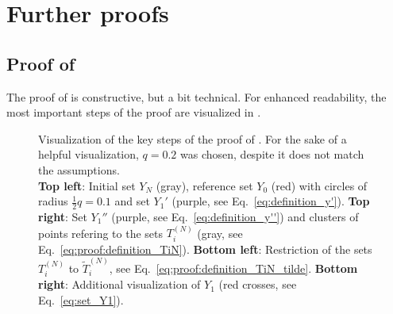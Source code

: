 \documentclass[a4paper, 10pt]{article}
\newlength\fwidth
\begin{document}
\section{Further proofs} \label{sec:proofs}

\subsection{Proof of }

The proof of  is constructive, but a bit technical.
For enhanced readability, the most important steps of the proof are visualized in .

\begin{figure}[t]
\setlength{}




\caption{Visualization of the key steps of the proof of .
For the sake of a helpful visualization, $q=0.2$ was chosen, despite it does not match the assumptions. \\
\textbf{Top left}: Initial set $Y_N$ (gray), reference set $Y_0$ (red) with circles of radius $\frac{1}{2} q = 0.1$ and set $Y_1'$ (purple, see Eq.~\eqref{eq:definition_y'}). 
\textbf{Top right}: Set $Y_1''$ (purple, see Eq.~\eqref{eq:definition_y''}) and clusters of points refering to the sets $T_i^{(N)}$ (gray, see Eq.~\eqref{eq:proof:definition_TiN}).
%
\textbf{Bottom left}: Restriction of the sets $T_i^{(N)}$ to $\tilde{T}_i^{(N)}$, see Eq.~\eqref{eq:proof:definition_TiN_tilde}. 
\textbf{Bottom right}: Additional visualization of $Y_1$ (red crosses, see Eq.~\eqref{eq:set_Y1}).}
\label{fig:vis_proof}
\end{figure}
\end{document}
